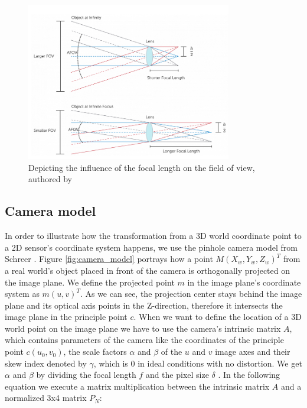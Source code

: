 \begin{figure}[h]
\centering
\includegraphics[width=0.8\textwidth]{images/camera_fov.png}
\caption[Single camera's FoV]{Depicting the influence of the focal length on the field of view, authored by \cite{camera_fov_website} \label{fig:camera_fov}}
\end{figure}

\subsection{Camera model}\label{camera_model}
In order to illustrate how the transformation from a 3D world coordinate point to a 2D sensor's coordinate system happens, we use the pinhole camera model from Schreer \cite{camera_pinhole_model}. Figure \ref{fig:camera_model} portrays how a point $M(X_{w}, Y_{w}, Z_{w})^{T}$ from a real world's object placed in front of the camera is orthogonally projected on the image plane. We define the projected point $m$ in the image plane's coordinate system as $m(u,v)^{T}$. As we can see, the projection center stays behind the image plane and its optical axis points in the Z-direction, therefore it intersects the image plane in the principle point $c$. When we want to define the location of a 3D world point on the image plane we have to use the camera's intrinsic matrix $A$, which contains parameters of the camera like the coordinates of the principle point $c(u_{0},v_{0})$, the scale factors $\alpha$ and $\beta$ of the $u$ and $v$ image axes and their skew index denoted by $\gamma$, which is 0 in ideal conditions with no distortion. We get $\alpha$ and $\beta$ by dividing the focal length $f$ and the pixel size $\delta$ . In the following equation we execute a matrix multiplication between the intrinsic matrix $A$ and a normalized 3x4 matrix $P_{N}$:

